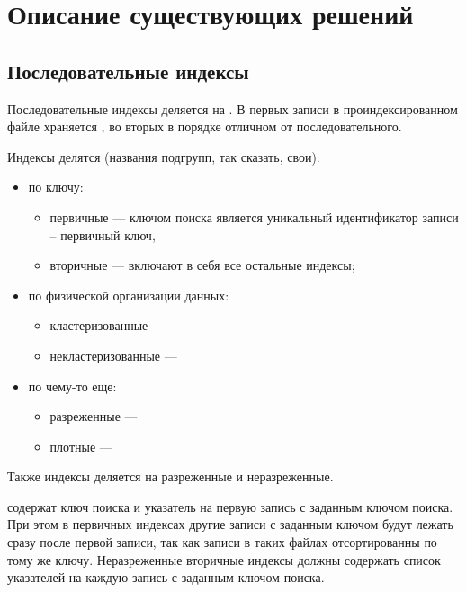 \chapter{Описание существующих решений}

\section{Последовательные индексы}

Последовательные индексы деляется на . В первых записи в проиндексированном
файле храняется , во
вторых в порядке отличном от последовательного.

Индексы делятся \bfit(названия подгрупп, так сказать, свои):

\begin{itemize}
    \item по ключу:
        \begin{itemize}
            \item первичные --- ключом поиска является уникальный идентификатор
                записи -- первичный ключ,
            \item вторичные --- включают в себя все остальные индексы;
        \end{itemize}
    \item по физической организации данных:
        \begin{itemize}
            \item кластеризованные ---
            \item некластеризованные ---
        \end{itemize}
    \item по чему-то еще:
        \begin{itemize}
            \item разреженные ---
            \item плотные ---
        \end{itemize}
\end{itemize}


Также индексы деляется на разреженные и неразреженные.

 содержат ключ поиска и указатель на первую запись с
заданным ключом поиска. При этом в первичных индексах другие записи с заданным
ключом будут лежать сразу после первой записи, так как записи в таких файлах
отсортированны по тому же ключу. Неразреженные вторичные индексы
должны содержать список указателей на каждую запись с заданным ключом поиска.

